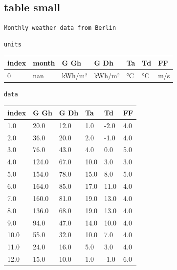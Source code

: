 \documentclass[reprint, floatfix, groupaddress, prb]{article}
\begin{document}
    \hypertarget{table-small}{%
\subsection{table small}\label{table-small}}

    \begin{Verbatim}[commandchars=\\\{\}]
Monthly weather data from Berlin
    \end{Verbatim}

    \begin{Verbatim}[commandchars=\\\{\}]
units
    \end{Verbatim}

    
        
    \begin{table}[ht] 
\begin{tabular}[l]{lllllll}
\toprule
index & month & G Gh & G Dh & Ta & Td & FF\\ 
\midrule
0 & nan & kWh/m² & kWh/m² & °C & °C & m/s\\ 
\bottomrule 
 \end{tabular}
\end{table}

    
    

    \begin{Verbatim}[commandchars=\\\{\}]
data
    \end{Verbatim}

    
        
    \begin{table}[ht] 
\begin{tabular}[l]{llllll}
\toprule
index & G Gh & G Dh & Ta & Td & FF\\ 
\midrule
1.0 & 20.0 & 12.0 & 1.0 & -2.0 & 4.0\\ 
2.0 & 36.0 & 20.0 & 2.0 & -1.0 & 4.0\\ 
3.0 & 76.0 & 43.0 & 4.0 & 0.0 & 5.0\\ 
4.0 & 124.0 & 67.0 & 10.0 & 3.0 & 3.0\\ 
5.0 & 154.0 & 78.0 & 15.0 & 8.0 & 5.0\\ 
6.0 & 164.0 & 85.0 & 17.0 & 11.0 & 4.0\\ 
7.0 & 160.0 & 81.0 & 19.0 & 13.0 & 4.0\\ 
8.0 & 136.0 & 68.0 & 19.0 & 13.0 & 4.0\\ 
9.0 & 94.0 & 47.0 & 14.0 & 10.0 & 4.0\\ 
10.0 & 55.0 & 32.0 & 10.0 & 7.0 & 4.0\\ 
11.0 & 24.0 & 16.0 & 5.0 & 3.0 & 4.0\\ 
12.0 & 15.0 & 10.0 & 1.0 & -1.0 & 6.0\\ 
\bottomrule 
 \end{tabular}
\end{table}
\end{document}

